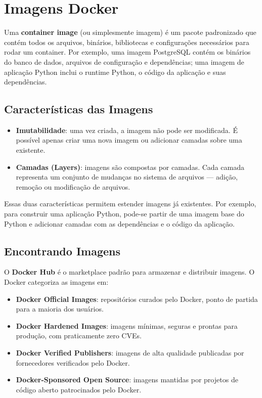 \section{Imagens Docker}

Uma \textbf{container image} (ou simplesmente imagem) é um pacote padronizado que contém todos os arquivos, binários, bibliotecas e configurações necessários para rodar um container. Por exemplo, uma imagem PostgreSQL contém os binários do banco de dados, arquivos de configuração e dependências; uma imagem de aplicação Python inclui o runtime Python, o código da aplicação e suas dependências.

\subsection{Características das Imagens}

\begin{itemize}
    \item \textbf{Imutabilidade}: uma vez criada, a imagem não pode ser modificada. É possível apenas criar uma nova imagem ou adicionar camadas sobre uma existente.
    \item \textbf{Camadas (Layers)}: imagens são compostas por camadas. Cada camada representa um conjunto de mudanças no sistema de arquivos --- adição, remoção ou modificação de arquivos.
\end{itemize}

Essas duas características permitem estender imagens já existentes. Por exemplo, para construir uma aplicação Python, pode-se partir de uma imagem base do Python e adicionar camadas com as dependências e o código da aplicação.

\subsection{Encontrando Imagens}

O \textbf{Docker Hub} é o marketplace padrão para armazenar e distribuir imagens. O Docker categoriza as imagens em:

\begin{itemize}
    \item \textbf{Docker Official Images}: repositórios curados pelo Docker, ponto de partida para a maioria dos usuários.
    \item \textbf{Docker Hardened Images}: imagens mínimas, seguras e prontas para produção, com praticamente zero CVEs.
    \item \textbf{Docker Verified Publishers}: imagens de alta qualidade publicadas por fornecedores verificados pelo Docker.
    \item \textbf{Docker-Sponsored Open Source}: imagens mantidas por projetos de código aberto patrocinados pelo Docker.
\end{itemize}

